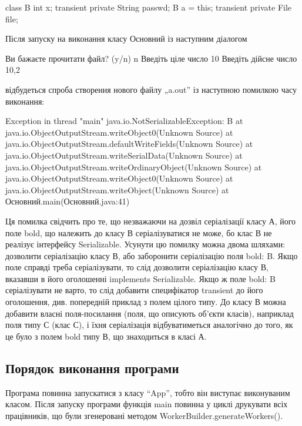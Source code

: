 class B {
	int x;
	transient private String passwd;
	B a = this;
	transient private File file;
}

Після запуску на виконання класу Основний із наступним діалогом 

Ви бажаєте прочитати файл? (y/n) 
n
Введіть ціле число
10
Введіть дійсне число
10,2

відбудеться спроба створення нового файлу „a.out” із наступною помилкою часу виконання:

Exception in thread "main" java.io.NotSerializableException: B
	at java.io.ObjectOutputStream.writeObject0(Unknown Source)
	at java.io.ObjectOutputStream.defaultWriteFields(Unknown Source)
	at java.io.ObjectOutputStream.writeSerialData(Unknown Source)
	at java.io.ObjectOutputStream.writeOrdinaryObject(Unknown Source)
	at java.io.ObjectOutputStream.writeObject0(Unknown Source)
	at java.io.ObjectOutputStream.writeObject(Unknown Source)
	at Основний.main(Основний.java:41)

Ця помилка свідчить про те, що незважаючи на дозвіл серіалізації класу А, його поле bold, що належить до класу В серіалізуватися не може, бо клас В не реалізує інтерфейсу Serializable. Усунути цю помилку можна двома шляхами: дозволити серіалізацію класу В, або заборонити серіалізацію поля bold: B. Якщо поле справді треба серіалізувати, то слід дозволити серіалізацію класу В, вказавши в його оголошенні implements Serializable. Якщо ж поле bold: B серіалізувати не варто, то слід добавити специфікатор transient до його оголошення, див. попередній приклад з полем цілого типу. 
До класу В можна добавити власні поля-посилання (поля, що описують об’єкти класів), наприклад поля типу С (клас С), і їхня серіалізація відбуватиметься аналогічно до того, як це було з полем bold типу В, що знаходиться в класі А.
 

\subsection{Порядок виконання програми}
Програма повинна запускатися з класу ``App'', тобто він виступає виконуваним класом. Після запуску програми функція main повинна у циклі друкувати всіх працівників, що були згенеровані методом WorkerBuilder.generateWorkers(). 

